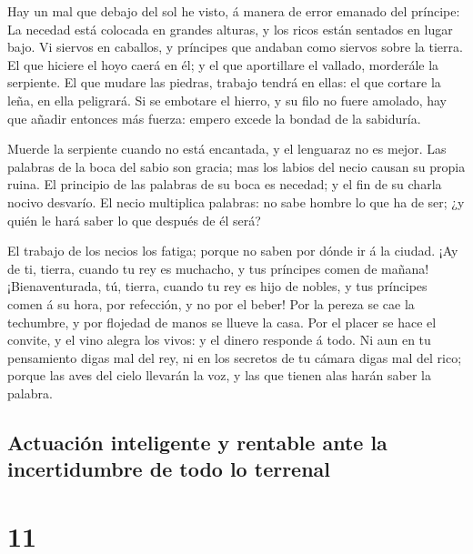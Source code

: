  Hay un mal que debajo del sol he visto, á manera de error
emanado del príncipe:  La necedad está colocada en grandes
alturas, y los ricos están sentados en lugar bajo.  Vi
siervos en caballos, y príncipes que andaban como siervos sobre la
tierra.  El que hiciere el hoyo caerá en él; y el que
aportillare el vallado, morderále la serpiente.  El que
mudare las piedras, trabajo tendrá en ellas: el que cortare la leña, en
ella peligrará.  Si se embotare el hierro, y su filo no
fuere amolado, hay que añadir entonces más fuerza: empero excede la
bondad de la sabiduría.

 Muerde la serpiente cuando no está encantada, y el
lenguaraz no es mejor.  Las palabras de la boca del sabio
son gracia; mas los labios del necio causan su propia ruina.
 El principio de las palabras de su boca es necedad; y el
fin de su charla nocivo desvarío.  El necio multiplica
palabras: no sabe hombre lo que ha de ser; ¿y quién le hará saber lo que
después de él será?

 El trabajo de los necios los fatiga; porque no saben por
dónde ir á la ciudad.  ¡Ay de ti, tierra, cuando tu rey
es muchacho, y tus príncipes comen de mañana! 
¡Bienaventurada, tú, tierra, cuando tu rey es hijo de nobles, y tus
príncipes comen á su hora, por refección, y no por el beber!
 Por la pereza se cae la techumbre, y por flojedad de
manos se llueve la casa.  Por el placer se hace el
convite, y el vino alegra los vivos: y el dinero responde á todo.
 Ni aun en tu pensamiento digas mal del rey, ni en los
secretos de tu cámara digas mal del rico; porque las aves del cielo
llevarán la voz, y las que tienen alas harán saber la palabra.

\hypertarget{actuaciuxf3n-inteligente-y-rentable-ante-la-incertidumbre-de-todo-lo-terrenal}{%
\subsection{Actuación inteligente y rentable ante la incertidumbre de
todo lo
terrenal}\label{actuaciuxf3n-inteligente-y-rentable-ante-la-incertidumbre-de-todo-lo-terrenal}}

\hypertarget{section-10}{%
\section{11}\label{section-10}}

